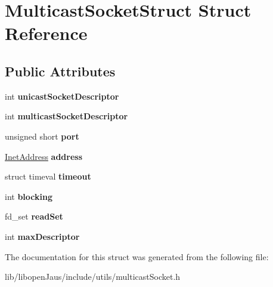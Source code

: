 \hypertarget{struct_multicast_socket_struct}{\section{\-Multicast\-Socket\-Struct \-Struct \-Reference}
\label{struct_multicast_socket_struct}
}
\subsection*{\-Public \-Attributes}
\begin{DoxyCompactItemize}
\item 
\hypertarget{struct_multicast_socket_struct_aa8bcd9e41147351d81d1d3df86973f40}{int {\bfseries unicast\-Socket\-Descriptor}}\label{struct_multicast_socket_struct_aa8bcd9e41147351d81d1d3df86973f40}

\item 
\hypertarget{struct_multicast_socket_struct_af046d638744fc8c76352713095f13a1e}{int {\bfseries multicast\-Socket\-Descriptor}}\label{struct_multicast_socket_struct_af046d638744fc8c76352713095f13a1e}

\item 
\hypertarget{struct_multicast_socket_struct_aa9ab541594e45ce5267ecf029a60c014}{unsigned short {\bfseries port}}\label{struct_multicast_socket_struct_aa9ab541594e45ce5267ecf029a60c014}

\item 
\hypertarget{struct_multicast_socket_struct_ae181f75a57e3e077ce2d128ea8d564d5}{\hyperlink{struct_inet_address_struct}{\-Inet\-Address} {\bfseries address}}\label{struct_multicast_socket_struct_ae181f75a57e3e077ce2d128ea8d564d5}

\item 
\hypertarget{struct_multicast_socket_struct_aa8aaa12f0416cdb4dd4ebec671339815}{struct timeval {\bfseries timeout}}\label{struct_multicast_socket_struct_aa8aaa12f0416cdb4dd4ebec671339815}

\item 
\hypertarget{struct_multicast_socket_struct_a3cfd5e4e6c7d3b156983b26969bc1032}{int {\bfseries blocking}}\label{struct_multicast_socket_struct_a3cfd5e4e6c7d3b156983b26969bc1032}

\item 
\hypertarget{struct_multicast_socket_struct_ab9a6fdff2688023c6f51df204c0c079e}{fd\-\_\-set {\bfseries read\-Set}}\label{struct_multicast_socket_struct_ab9a6fdff2688023c6f51df204c0c079e}

\item 
\hypertarget{struct_multicast_socket_struct_a787b98c4a7028e0762265f1f0fea476e}{int {\bfseries max\-Descriptor}}\label{struct_multicast_socket_struct_a787b98c4a7028e0762265f1f0fea476e}

\end{DoxyCompactItemize}


\-The documentation for this struct was generated from the following file\-:\begin{DoxyCompactItemize}
\item 
lib/libopen\-Jaus/include/utils/multicast\-Socket.\-h\end{DoxyCompactItemize}

